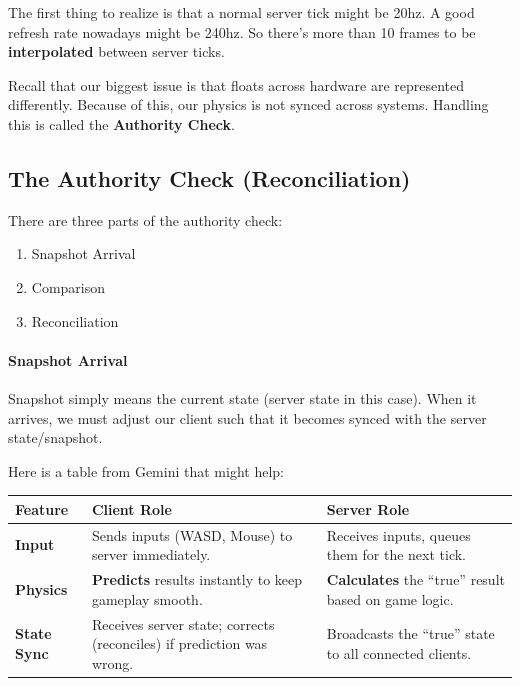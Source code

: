 \documentclass{article}
\begin{document}
\par The first thing to realize is that a normal server tick might be
20hz. A good refresh rate nowadays might be 240hz. So there's more
than 10 frames to be \textbf{interpolated} between server ticks.

\par Recall that our biggest issue is that floats across hardware are
represented differently. Because of this, our physics is not synced
across systems. Handling this is called the \textbf{Authority Check}.

\subsection*{The Authority Check
(Reconciliation)}
\par There are three parts of the authority check:
\begin{enumerate}
\item Snapshot Arrival
\item Comparison
\item Reconciliation
\end{enumerate}

\paragraph*{Snapshot Arrival}
Snapshot simply means the current state (server state in this case).
When it arrives, we must adjust our client such that it becomes
synced with the server state/snapshot.

\par Here is a table from Gemini that might help:

\begin{table}[H]
\centering
\begin{tabularx}{\textwidth}{l X X}
  \toprule
  Feature & Client Role & Server Role \\
  \midrule
  \textbf{Input}
  & Sends inputs (WASD, Mouse) to server immediately.
  & Receives inputs, queues them for the next tick. \\
  \addlinespace %
  \textbf{Physics}
  & \textbf{Predicts} results instantly to keep gameplay smooth.
  & \textbf{Calculates} the ``true'' result based on game logic. \\
  \addlinespace
  \textbf{State Sync}
  & Receives server state; corrects (reconciles) if prediction was wrong.
  & Broadcasts the ``true'' state to all connected clients. \\
  \bottomrule
\end{tabularx}
\end{table}
\end{document}
